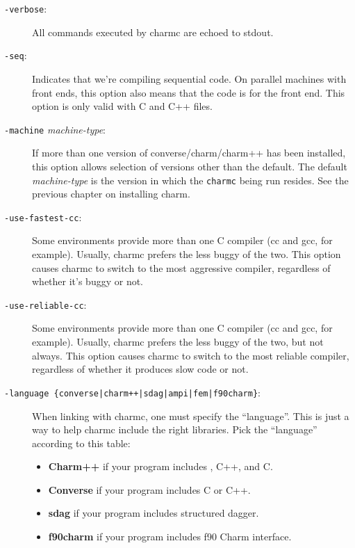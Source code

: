\begin{description}
\item[{\tt -verbose}:]

All commands executed by charmc are echoed to stdout.

\item[{\tt -seq}:]

Indicates that we're compiling sequential code.  On parallel machines
with front ends, this option also means that the code is for the front
end.  This option is only valid with C and C++ files.

\item[{\tt -machine} {\em machine-type}:]

If more than one version of converse/charm/charm++ has been installed,
this option allows selection of versions other than the default.  The
default {\em machine-type} is the version in which the {\tt charmc}
being run resides.  See the previous chapter on installing charm.

\item[{\tt -use-fastest-cc}:]

Some environments provide more than one C compiler (cc and gcc, for
example).  Usually, charmc prefers the less buggy of the two.  This
option causes charmc to switch to the most aggressive compiler,
regardless of whether it's buggy or not.

\item[{\tt -use-reliable-cc}:]

Some environments provide more than one C compiler (cc and gcc, for
example).  Usually, charmc prefers the less buggy of the two, but
not always.  This option causes charmc to switch to the most reliable
compiler, regardless of whether it produces slow code or not.

\item[{\tt -language \{converse|charm++|sdag|ampi|fem|f90charm\}}:]

When linking with charmc, one must specify the ``language''.  This
is just a way to help charmc include the right libraries.  Pick the
``language'' according to this table:

\begin{itemize}
\item{{\bf Charm++} if your program includes \charmpp{}, C++, and C.}
\item{{\bf Converse} if your program includes C or C++.}
\item{{\bf sdag} if your program includes structured dagger.}
\item{{\bf f90charm} if your program includes f90 Charm interface.}
\end{itemize}


\end{description}
